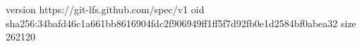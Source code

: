 version https://git-lfs.github.com/spec/v1
oid sha256:34bafd46c1a661bb8616904fdc2f906949ff1ff5f7d92fb0e1d2584bf0abea32
size 262120

